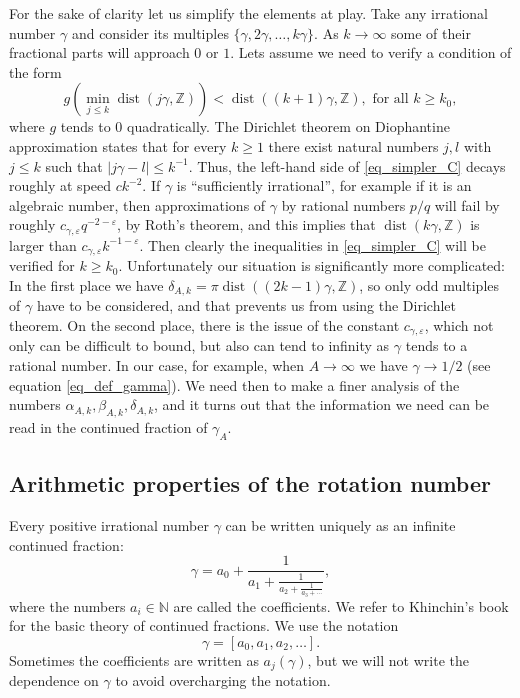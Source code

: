 \documentclass{amsart}
\def \N{\mathbb N}
\def \Z{\mathbb Z}
\newcommand \dist {\operatorname{dist}}
\begin{document}
	For the sake of clarity let us simplify the elements at play. Take any irrational number $\gamma$ and consider its multiples $\{\gamma, 2 \gamma, \ldots, k\gamma \}$. As $k \to \infty$ some of their fractional parts will approach $0$ or $1$.
	Lets assume we need to verify a condition of the form
	\begin{equation}
		\label{eq_simpler_C}
		g(\min_{j\leq k} \dist(j \gamma, \Z)) < \dist((k+1) \gamma, \Z), \text{ for all } k \geq k_0,
	\end{equation}
	where $g$ tends to $0$ quadratically.
	The Dirichlet theorem on Diophantine approximation states that for every $k \geq 1$ there exist natural numbers $j,l$ with $j \leq k$ such that $|j \gamma - l| \leq k^{-1}$.
	Thus, the left-hand side of \eqref{eq_simpler_C} decays roughly at speed $c k^{-2}$.
	If $\gamma$ is ``sufficiently irrational'', for example if it is an algebraic number, then approximations of $\gamma$ by rational numbers $p/q$ will fail by roughly $c_{\gamma,\varepsilon} q^{-2-\varepsilon}$, by Roth's theorem, and this implies that $\dist(k \gamma,\Z)$ is larger than $c_{\gamma,\varepsilon} k^{-1-\varepsilon}$.
	Then clearly the inequalities in \eqref{eq_simpler_C} will be verified for $k \geq k_0$.
	Unfortunately our situation is significantly more complicated: In the first place we have $\delta_{A,k} = \pi \dist((2k-1) \gamma, \Z)$, so only odd multiples of $\gamma$ have to be considered, and that prevents us from using the Dirichlet theorem.
	On the second place, there is the issue of the constant $c_{\gamma, \varepsilon}$, which not only can be difficult to bound, but also can tend to infinity as $\gamma$ tends to a rational number. In our case, for example, when $A \to \infty$ we have $\gamma \to 1/2$ (see equation \eqref{eq_def_gamma}).
	We need then to make a finer analysis of the numbers $\alpha_{A,k}, \beta_{A,k}, \delta_{A,k}$, and it turns out that the information we need can be read in the continued fraction of $\gamma_A$.

\subsection{Arithmetic properties of the rotation number}
\label{sec_arithmetic}


Every positive irrational number $\gamma$ can be written uniquely as an infinite continued fraction:
\[\gamma = a_0 + \frac 1{a_1 + \frac 1 {a_2 + \frac 1 {a_3 + \cdots}}},\]
where the numbers $a_i \in \N$ are called the coefficients.
We refer to Khinchin's book \cite{khinchin1964continued} for the basic theory of continued fractions.
We use the notation 
\[\gamma = [a_0, a_1, a_2, \ldots ].\]
Sometimes the coefficients are written as $a_j(\gamma)$, but we will not write the dependence on $\gamma$ to avoid overcharging the notation.
\end{document}
